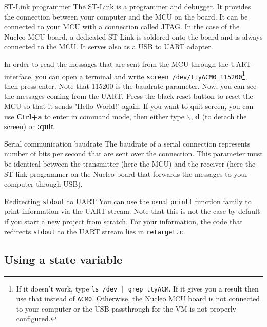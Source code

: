 \begin{bclogo}[couleur = gray!20, arrondi = 0.2, logo=\bcinfo]{ST-Link programmer}
The ST-Link is a programmer and debugger. It provides the connection between your computer and the MCU on the board. It can be connected to your MCU with a connection called JTAG. In the case of the Nucleo MCU board, a dedicated ST-Link is soldered onto the board and is always connected to the MCU. It serves also as a USB to UART adapter.
\end{bclogo}

In order to read the messages that are sent from the MCU through the UART interface, you can open a terminal and write \texttt{screen /dev/ttyACM0 115200}\footnote{If it doesn't work, type \texttt{ls /dev | grep ttyACM}. If it gives you a result then use that instead of \texttt{ACM0}. Otherwise, the Nucleo MCU board is not connected to your computer or the USB passthrough for the VM is not properly configured.}, then press enter. Note that 115200 is the baudrate parameter. Now, you can see the messages coming from the UART. Press the black reset button to reset the MCU so that it sends "Hello World!" again. If you want to quit screen, you can use \textbf{Ctrl+a} to enter in command mode, then either type \textbf{$\backslash$}, \textbf{d} (to detach the screen) or \textbf{:quit}.
\begin{bclogo}[couleur = gray!20, arrondi = 0.2, logo=\bcinfo]{Serial communication baudrate }
The baudrate of a serial connection represents number of bits per second that are sent over the connection. This parameter must be identical between the transmitter (here the MCU) and the receiver (here the ST-link programmer on the Nucleo board that forwards the messages to your computer through USB). \end{bclogo}


\begin{bclogo}[couleur = gray!20, arrondi = 0.2, logo=\bcinfo]{Redirecting \texttt{stdout} to UART}
You can use the usual \texttt{printf} function family to print information via the UART stream. Note that this is not the case by default if you start a new project from scratch. For your information, the code that redirects \texttt{stdout} to the UART stream lies in \texttt{retarget.c}.
\end{bclogo}


\subsection{Using a state variable}

